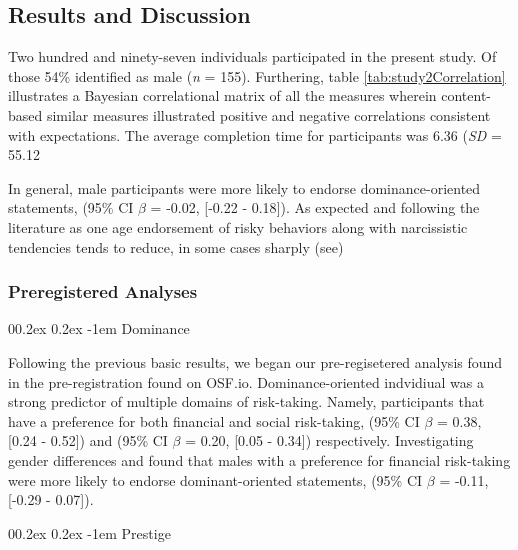 \documentclass[
  donotrepeattitle,doc, 12pt, a4paper,floatsintext]{apa7}
\makeatletter
\let\oldparagraph\paragraph
\renewcommand{\paragraph}[1]{\oldparagraph{#1}\mbox{}}
\renewcommand{\paragraph}{\@startsection{paragraph}{4}{\parindent}%
  {0\baselineskip \@plus 0.2ex \@minus 0.2ex}%
  {-1em}%
  {\normalfont\normalsize\bfseries\itshape\typesectitle}}
\makeatother
\begin{document}
\hypertarget{results-and-discussion}{%
\subsection{Results and Discussion}\label{results-and-discussion}}

Two hundred and ninety-seven individuals participated in the present study. Of those 54\% identified as male (\emph{n} = 155). Furthering, table \ref{tab:study2Correlation} illustrates a Bayesian correlational matrix of all the measures wherein content-based similar measures illustrated positive and negative correlations consistent with expectations. The average completion time for participants was 6.36 (\emph{SD} = 55.12

In general, male participants were more likely to endorse dominance-oriented statements, (95\% CI \(\beta\) = -0.02, {[}-0.22 - 0.18{]}). As expected and following the literature as one age endorsement of risky behaviors along with narcissistic tendencies tends to reduce, in some cases sharply (see)

\hypertarget{preregistered-analyses-1}{%
\subsubsection{Preregistered Analyses}\label{preregistered-analyses-1}}

\hypertarget{dominance-1}{%
\paragraph{Dominance}\label{dominance-1}}

Following the previous basic results, we began our pre-regisetered analysis found in the pre-registration found on OSF.io. Dominance-oriented indvidiual was a strong predictor of multiple domains of risk-taking. Namely, participants that have a preference for both financial and social risk-taking, (95\% CI \(\beta\) = 0.38, {[}0.24 - 0.52{]}) and (95\% CI \(\beta\) = 0.20, {[}0.05 - 0.34{]}) respectively. Investigating gender differences and found that males with a preference for financial risk-taking were more likely to endorse dominant-oriented statements, (95\% CI \(\beta\) = -0.11, {[}-0.29 - 0.07{]}).

\hypertarget{prestige-1}{%
\paragraph{Prestige}\label{prestige-1}}
\end{document}
